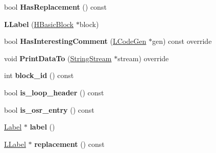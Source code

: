 \begin{DoxyCompactItemize}
\item 
bool {\bfseries Has\+Replacement} () const \hypertarget{classv8_1_1internal_1_1_l_label_a3215ec5382dd576d965f7ff0e18a7b0e}{}\label{classv8_1_1internal_1_1_l_label_a3215ec5382dd576d965f7ff0e18a7b0e}

\item 
{\bfseries L\+Label} (\hyperlink{classv8_1_1internal_1_1_h_basic_block}{H\+Basic\+Block} $\ast$block)\hypertarget{classv8_1_1internal_1_1_l_label_aa8ea13a89f3934f66742778ba3f83cd4}{}\label{classv8_1_1internal_1_1_l_label_aa8ea13a89f3934f66742778ba3f83cd4}

\item 
bool {\bfseries Has\+Interesting\+Comment} (\hyperlink{classv8_1_1internal_1_1_l_code_gen}{L\+Code\+Gen} $\ast$gen) const  override\hypertarget{classv8_1_1internal_1_1_l_label_aa0a8236af4aaa8c0433e5082df86d31a}{}\label{classv8_1_1internal_1_1_l_label_aa0a8236af4aaa8c0433e5082df86d31a}

\item 
void {\bfseries Print\+Data\+To} (\hyperlink{classv8_1_1internal_1_1_string_stream}{String\+Stream} $\ast$stream) override\hypertarget{classv8_1_1internal_1_1_l_label_ac1318b8f414140c11ee85e3acd00491f}{}\label{classv8_1_1internal_1_1_l_label_ac1318b8f414140c11ee85e3acd00491f}

\item 
int {\bfseries block\+\_\+id} () const \hypertarget{classv8_1_1internal_1_1_l_label_a87739f07ada487049bd402d117ea0bdc}{}\label{classv8_1_1internal_1_1_l_label_a87739f07ada487049bd402d117ea0bdc}

\item 
bool {\bfseries is\+\_\+loop\+\_\+header} () const \hypertarget{classv8_1_1internal_1_1_l_label_a310f97c551f5ab43f42ef04d2b97b349}{}\label{classv8_1_1internal_1_1_l_label_a310f97c551f5ab43f42ef04d2b97b349}

\item 
bool {\bfseries is\+\_\+osr\+\_\+entry} () const \hypertarget{classv8_1_1internal_1_1_l_label_a2a98f2b24dada94a6a1e4f78b0cb88be}{}\label{classv8_1_1internal_1_1_l_label_a2a98f2b24dada94a6a1e4f78b0cb88be}

\item 
\hyperlink{classv8_1_1internal_1_1_label}{Label} $\ast$ {\bfseries label} ()\hypertarget{classv8_1_1internal_1_1_l_label_aad0d2d6e266d7d6ee11d0d4d2e4342c8}{}\label{classv8_1_1internal_1_1_l_label_aad0d2d6e266d7d6ee11d0d4d2e4342c8}

\item 
\hyperlink{classv8_1_1internal_1_1_l_label}{L\+Label} $\ast$ {\bfseries replacement} () const \hypertarget{classv8_1_1internal_1_1_l_label_aeae2ce751911693b33505ace069c9f38}{}\label{classv8_1_1internal_1_1_l_label_aeae2ce751911693b33505ace069c9f38}


\end{DoxyCompactItemize}

